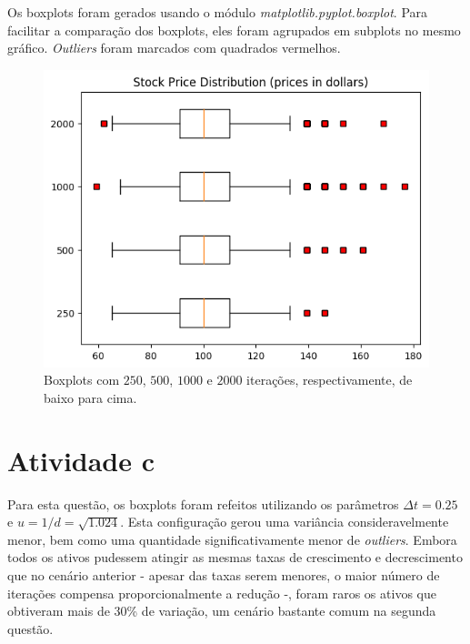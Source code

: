 \documentclass{article}
\begin{document}
Os boxplots foram gerados usando o módulo \emph{matplotlib.pyplot.boxplot}.
Para facilitar a comparação dos boxplots, eles foram agrupados em subplots no mesmo gráfico.
\emph{Outliers} foram marcados com quadrados vermelhos.

\begin{figure}[H]
	\includegraphics[width=\linewidth]{fig1_250.png}
	\centering
	
	\caption{Boxplots com $250$, $500$, $1000$ e $2000$ iterações, respectivamente, de baixo para cima.}
	\label{}
\end{figure}


\section*{Atividade c}

Para esta questão, os boxplots foram refeitos utilizando os parâmetros $\Delta t = 0.25$ e $u = 1/d = \sqrt{1.024}$.
Esta configuração gerou uma variância consideravelmente menor, bem como uma quantidade significativamente menor de \emph{outliers}.
Embora todos os ativos pudessem atingir as mesmas taxas de crescimento e decrescimento que no cenário anterior - apesar das taxas serem menores, o maior número de iterações compensa proporcionalmente a redução -, foram raros os ativos que obtiveram mais de 30\% de variação, um cenário bastante comum na segunda questão.
\end{document}
